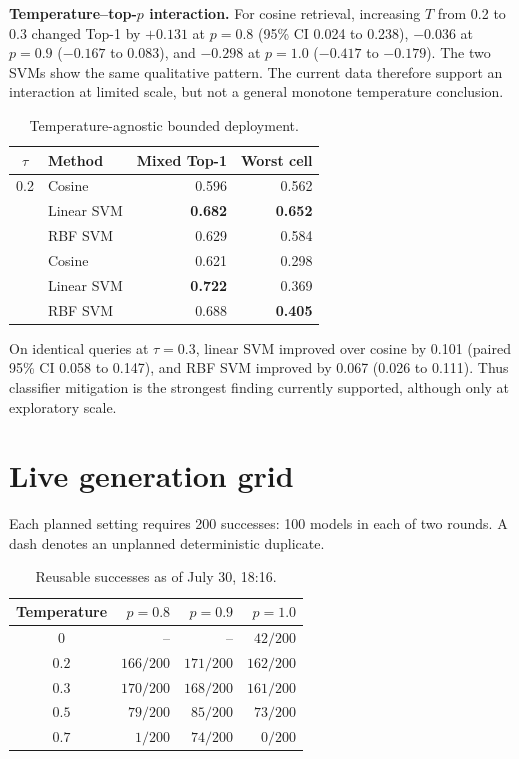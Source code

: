 \documentclass[10pt,a4paper]{article}
\begin{document}
\textbf{Temperature--top-$p$ interaction.}
For cosine retrieval, increasing $T$ from 0.2 to 0.3 changed Top-1 by
$+0.131$ at $p=0.8$ (95\% CI 0.024 to 0.238), $-0.036$ at $p=0.9$
($-0.167$ to 0.083), and $-0.298$ at $p=1.0$ ($-0.417$ to $-0.179$).
The two SVMs show the same qualitative pattern. The current data therefore
support an interaction at limited scale, but not a general monotone
temperature conclusion.

\begin{table}[h]
\centering
\small
\caption{Temperature-agnostic bounded deployment.}
\begin{tabular}{clrr}
\toprule
$\tau$ & Method & Mixed Top-1 & Worst cell \\
\midrule
0.2 & Cosine & 0.596 & 0.562 \\
    & Linear SVM & \textbf{0.682} & \textbf{0.652} \\
    & RBF SVM & 0.629 & 0.584 \\
\addlinespace
0.3 & Cosine & 0.621 & 0.298 \\
    & Linear SVM & \textbf{0.722} & 0.369 \\
    & RBF SVM & 0.688 & \textbf{0.405} \\
\bottomrule
\end{tabular}
\end{table}

On identical queries at $\tau=0.3$, linear SVM improved over cosine by 0.101
(paired 95\% CI 0.058 to 0.147), and RBF SVM improved by 0.067
(0.026 to 0.111). Thus classifier mitigation is the strongest finding
currently supported, although only at exploratory scale.

\clearpage
\section{Live generation grid}

Each planned setting requires 200 successes: 100 models in each of two rounds.
A dash denotes an unplanned deterministic duplicate.

\begin{table}[h]
\centering
\small
\caption{Reusable successes as of July 30, 18:16.}
\begin{tabular}{crrr}
\toprule
Temperature & $p=0.8$ & $p=0.9$ & $p=1.0$ \\
\midrule
$0$   & -- & -- & $42/200$ \\
$0.2$ & $166/200$ & $171/200$ & $162/200$ \\
$0.3$ & $170/200$ & $168/200$ & $161/200$ \\
$0.5$ & $79/200$  & $85/200$  & $73/200$ \\
$0.7$ & $1/200$   & $74/200$  & $0/200$ \\
\bottomrule
\end{tabular}
\end{table}
\end{document}
